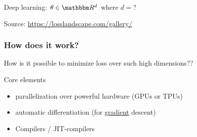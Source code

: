 \begin{frame}

    Deep learning: $\theta \in \RR^d$ where $d = ?$
    
    \begin{figure}
       \begin{center}
       \end{center}
    \end{figure}

    Source: \url{https://losslandscape.com/gallery/}

\end{frame}




\begin{frame}
    \frametitle{How does it work?}
    
    How is it possible to minimize loss over such high dimensions??

        \vspace{0.5em}
        \vspace{0.5em}
        \vspace{0.5em}
        \vspace{0.5em}
        \pause

    Core elements
    \begin{itemize}
        \item parallelization over powerful hardware (GPUs or TPUs)
        \vspace{0.5em}
        \item automatic differentiation (for \underline{gradient} descent)
        \vspace{0.5em}
        \item Compilers / JIT-compilers
    \end{itemize}

\end{frame}

